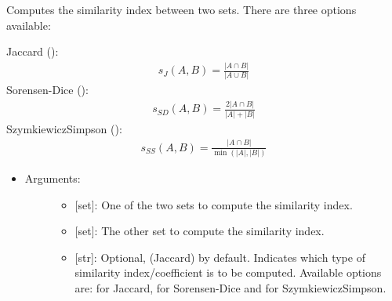 \documentclass[letterpaper,10pt,english]{sphinxmanual}
\begin{document}

\begin{fulllineitems}
\label{\detokenize{iterables:data_tools.iterables.similarity}}
Computes the similarity index between two sets. There are three
options available:

Jaccard ():
\begin{equation*}
\begin{split}s_J(A,B) = \frac{|A\cap B|}{|A\cup B|}\end{split}
\end{equation*}
Sorensen-Dice ():
\begin{equation*}
\begin{split}s_{SD}(A,B) = \frac{2|A\cap B|}{|A|+|B|}\end{split}
\end{equation*}
Szymkiewicz\textendash{}Simpson ():
\begin{equation*}
\begin{split}s_{SS}(A,B) = \frac{|A\cap B|}{\min(|A|,|B|)}\end{split}
\end{equation*}\begin{itemize}
\item {} \begin{description}
\item[{Arguments:}] \leavevmode\begin{itemize}
\item {} 
 {[}set{]}: One of the two sets to compute the similarity
index.

\item {} 
 {[}set{]}: The other set to compute the similarity index.

\item {} 
 {[}str{]}: Optional,  (Jaccard) by default.
Indicates which type of similarity index/coefficient is to be
computed. Available options are:  for Jaccard, 
for Sorensen-Dice and  for Szymkiewicz\textendash{}Simpson.

\end{itemize}


\end{description}
\end{itemize}
\end{fulllineitems}
\end{document}
